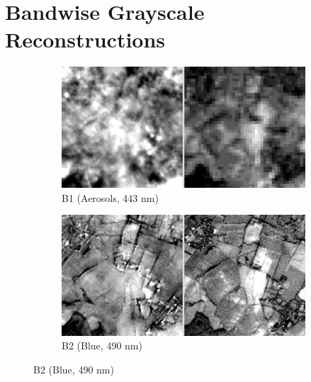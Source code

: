 \chapter{Bandwise Grayscale Reconstructions}
\label{appendix:bandwise_results}

\begin{figure}[h!]
    \centering
    \captionsetup[subfigure]{labelformat=empty}

    \begin{subfigure}{0.48\textwidth}
        \centering
        \includegraphics[width=\linewidth]{img/bands_gray/sample_000008_B01_panel.png}
        \caption{B1 (Aerosols, 443 nm)}
    \end{subfigure}\hfill
    \begin{subfigure}{0.48\textwidth}
        \centering
        \includegraphics[width=\linewidth]{img/bands_gray/sample_000008_B02_panel.png}
        \caption{B2 (Blue, 490 nm)}
    \end{subfigure}


\end{figure}
